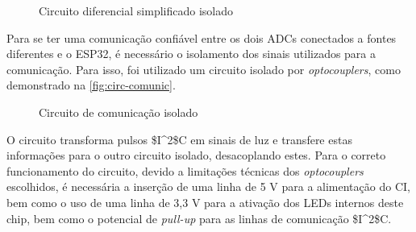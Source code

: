\begin{figure}[htb!]
    \caption{Circuito diferencial simplificado isolado}
    \label{fig:dif-isolado}
    \fonte{}
\end{figure}

Para se ter uma comunicação confiável entre os dois \gls{ADC}s conectados a fontes diferentes e o ESP32, é necessário o isolamento dos sinais utilizados para a comunicação. Para isso, foi utilizado um circuito isolado por \textit{optocouplers}, como demonstrado na \autoref{fig:circ-comunic}.

\begin{figure}[htb!]
    \caption{Circuito de comunicação isolado}
    \label{fig:circ-comunic}
    \fonte{}
\end{figure}

O circuito transforma pulsos \gls{$I^2$C} em sinais de luz e transfere estas informações para o outro circuito isolado, desacoplando estes. Para o correto funcionamento do circuito, devido a limitações técnicas dos \textit{optocouplers} escolhidos, é necessária a inserção de uma linha de 5 V para a alimentação do \gls{CI}, bem como o uso de uma linha de 3,3 V para a ativação dos LEDs internos deste chip, bem como o potencial de \textit{pull-up} para as linhas de comunicação \gls{$I^2$C}.

